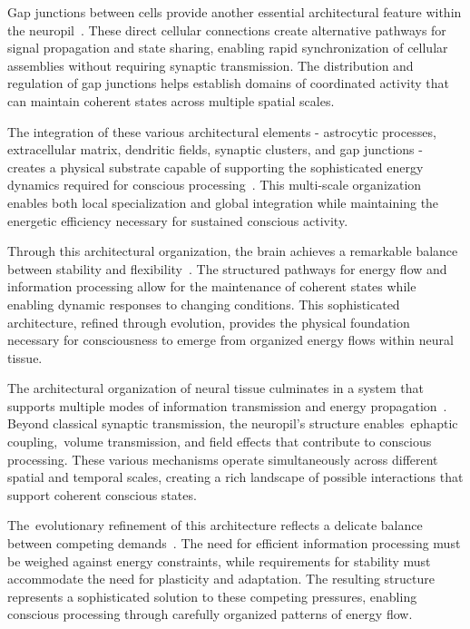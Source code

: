 Gap junctions between cells provide another essential architectural feature within the neuropil~\cite{Zeng2017, Bennett2004}. These direct cellular connections create alternative pathways for signal propagation and state sharing, enabling rapid synchronization of cellular assemblies without requiring synaptic transmission. The distribution and regulation of gap junctions helps establish domains of coordinated activity that can maintain coherent states across multiple spatial scales.

The integration of these various architectural elements - astrocytic processes, extracellular matrix, dendritic fields, synaptic clusters, and gap junctions - creates a physical substrate capable of supporting the sophisticated energy dynamics required for conscious processing~\cite{Bassett2017, Buzsaki2004}. This multi-scale organization enables both local specialization and global integration while maintaining the energetic efficiency necessary for sustained conscious activity.

Through this architectural organization, the brain achieves a remarkable balance between stability and flexibility~\cite{Buzsaki2006, Wang2020}. The structured pathways for energy flow and information processing allow for the maintenance of coherent states while enabling dynamic responses to changing conditions. This sophisticated architecture, refined through evolution, provides the physical foundation necessary for consciousness to emerge from organized energy flows within neural tissue.

The architectural organization of neural tissue culminates in a system that supports multiple modes of information transmission and energy propagation~\cite{VanEssen2018, pinotsis2023cytoelectric}. Beyond classical synaptic transmission, the neuropil's structure enables~ephaptic coupling,~volume transmission, and field effects that contribute to conscious processing. These various mechanisms operate simultaneously across different spatial and temporal scales, creating a rich landscape of possible interactions that support coherent conscious states.

The~evolutionary refinement of this architecture reflects a delicate balance between competing demands~\cite{Hilgetag2020, Rakic2009}. The need for efficient information processing must be weighed against energy constraints, while requirements for stability must accommodate the need for plasticity and adaptation. The resulting structure represents a sophisticated solution to these competing pressures, enabling conscious processing through carefully organized patterns of energy flow.

